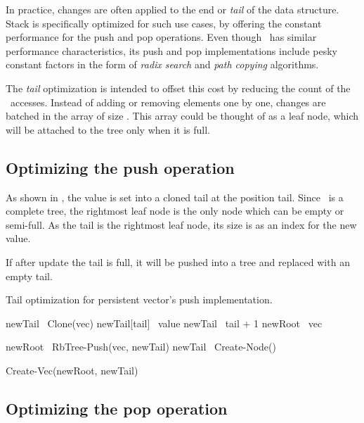 In practice, changes are often applied to the end or \emph{tail} of the data structure. Stack is specifically optimized for such use cases, by offering the constant performance for the push and pop operations. Even though \rbtree\ has similar performance characteristics, its push and pop implementations include pesky constant factors in the form of \emph{radix search} and \emph{path copying} algorithms.

The \emph{tail} optimization is intended to offset this cost by reducing the count of the \rbtree\ accesses. Instead of adding or removing elements one by one, changes are batched in the array of size \m. This array could be thought of as a leaf node, which will be attached to the tree only when it is full.

\subsection*{Optimizing the push operation}
As shown in , the value is set into a cloned tail at the position tail. Since \rbtree\ is a complete tree, the rightmost leaf node is the only node which can be empty or semi-full. As the tail is the rightmost leaf node, its size is as an index for the new value.

If after update the tail is full, it will be pushed into a tree and replaced with an empty tail.

\begin{listing}[ht!]
    \caption{Tail optimization for persistent vector’s push implementation.}
    \label{lst:pvec-push}

    \begin{algorithmic}
        \State newTail \la\ Clone(vec)
        \State newTail[tail] \la\ value
        \State newTail \la\ tail + 1
        \State newRoot \la\ vec

            \State newRoot \la\ RbTree-Push(vec, newTail)
            \State newTail \la\ Create-Node()
        \EndIf

        \State \Return Create-Vec(newRoot, newTail)
        \EndFunction
    \end{algorithmic}
\end{listing}

\subsection*{Optimizing the pop operation}

